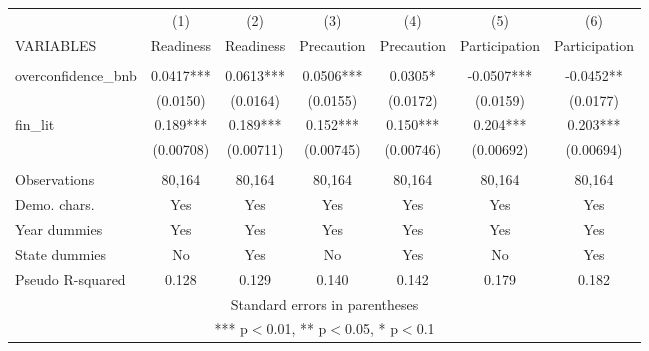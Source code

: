 \documentclass[]{article}
\begin{document}
\begin{tabular}{lcccccc} \hline
 & (1) & (2) & (3) & (4) & (5) & (6) \\
VARIABLES & Readiness & Readiness & Precaution & Precaution & Participation & Participation \\ \hline
 &  &  &  &  &  &  \\
overconfidence\_bnb & 0.0417*** & 0.0613*** & 0.0506*** & 0.0305* & -0.0507*** & -0.0452** \\
 & (0.0150) & (0.0164) & (0.0155) & (0.0172) & (0.0159) & (0.0177) \\
fin\_lit & 0.189*** & 0.189*** & 0.152*** & 0.150*** & 0.204*** & 0.203*** \\
 & (0.00708) & (0.00711) & (0.00745) & (0.00746) & (0.00692) & (0.00694) \\
 &  &  &  &  &  &  \\
Observations & 80,164 & 80,164 & 80,164 & 80,164 & 80,164 & 80,164 \\
Demo. chars. & Yes & Yes & Yes & Yes & Yes & Yes \\
Year dummies & Yes & Yes & Yes & Yes & Yes & Yes \\
State dummies & No & Yes & No & Yes & No & Yes \\
 Pseudo R-squared & 0.128 & 0.129 & 0.140 & 0.142 & 0.179 & 0.182 \\ \hline
\multicolumn{7}{c}{ Standard errors in parentheses} \\
\multicolumn{7}{c}{ *** p$<$0.01, ** p$<$0.05, * p$<$0.1} \\
\end{tabular}
\end{document}
